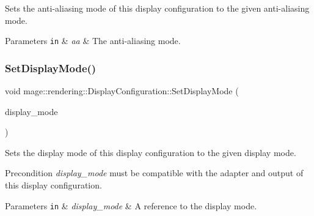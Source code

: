 Sets the anti-\/aliasing mode of this display configuration to the given anti-\/aliasing mode.


\begin{DoxyParams}[1]{Parameters}
\mbox{\tt in}  & {\em aa} & The anti-\/aliasing mode. \\
\hline
\end{DoxyParams}
\hypertarget{classmage_1_1rendering_1_1_display_configuration_a7cc6b9dcf3932a62bfd1416fc7b397ea}{}\label{classmage_1_1rendering_1_1_display_configuration_a7cc6b9dcf3932a62bfd1416fc7b397ea} 
\subsubsection{\texorpdfstring{Set\+Display\+Mode()}{SetDisplayMode()}}
{\footnotesize\ttfamily void mage\+::rendering\+::\+Display\+Configuration\+::\+Set\+Display\+Mode (\begin{DoxyParamCaption}\item[{const D\+X\+G\+I\+\_\+\+M\+O\+D\+E\+\_\+\+D\+E\+SC \&}]{display\+\_\+mode }\end{DoxyParamCaption})\hspace{0.3cm}{\ttfamily [noexcept]}}

Sets the display mode of this display configuration to the given display mode.

\begin{DoxyPrecond}{Precondition}
{\itshape display\+\_\+mode} must be compatible with the adapter and output of this display configuration. 
\end{DoxyPrecond}

\begin{DoxyParams}[1]{Parameters}
\mbox{\tt in}  & {\em display\+\_\+mode} & A reference to the display mode. \\
\hline
\end{DoxyParams}
\hypertarget{classmage_1_1rendering_1_1_display_configuration_a5e15cc1ca56718a7892b80cd0a1d20c0}{}\label{classmage_1_1rendering_1_1_display_configuration_a5e15cc1ca56718a7892b80cd0a1d20c0} 
